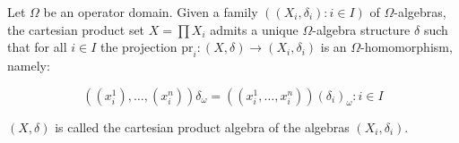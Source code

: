 Let $\Omega$ be an operator domain. Given a family $((X_i, \delta_i): i \in I)$ of $\Omega$-algebras, the cartesian product set $X = \prod X_i$ admits a unique $\Omega$-algebra structure $\delta$ such that for all $i \in I$ the projection $\mathrm{pr}_i: (X, \delta) \longrightarrow (X_i, \delta_i)$ is an $\Omega$-homomorphism, namely:

$$((x_i^1), \ldots, (x_i^n)) \delta_\omega = ((x_i^1, \ldots, x_i^n)) (\delta_i)_\omega: i \in I$$

$(X, \delta)$ is called the cartesian product algebra of the algebras $(X_i, \delta_i)$.
